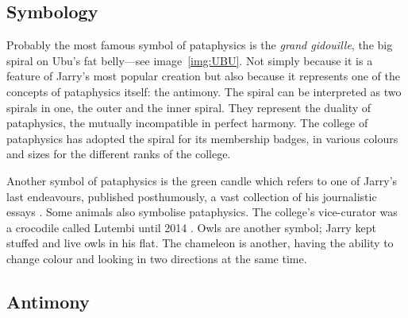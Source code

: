 \subsection{Symbology}

Probably the most famous symbol of pataphysics is the \emph{grand gidouille}, the big spiral on Ubu's fat belly---see image~\ref{img:UBU}. Not simply because it is a feature of Jarry's most popular creation but also because it represents one of the concepts of pataphysics itself: the antimony. The spiral can be interpreted as two spirals in one, the outer and the inner spiral. They represent the duality of pataphysics, the mutually incompatible in perfect harmony. The college of pataphysics has adopted the spiral for its membership badges, in various colours and sizes for the different ranks of the college.

Another symbol of pataphysics is the green candle which refers to one of Jarry's last endeavours, published posthumously, a vast collection of his journalistic essays \autocite{Hugill2012}. Some animals also symbolise pataphysics. The college's vice-curator was a crocodile called Lutembi until 2014 \autocite{Hugill2012}. Owls are another symbol; Jarry kept stuffed and live owls \autocite{Brotchie2011a} in his flat. The chameleon is another, having the ability to change colour and looking in two directions at the same time.



\subsection{Antimony}
\label{s:antinomy}

